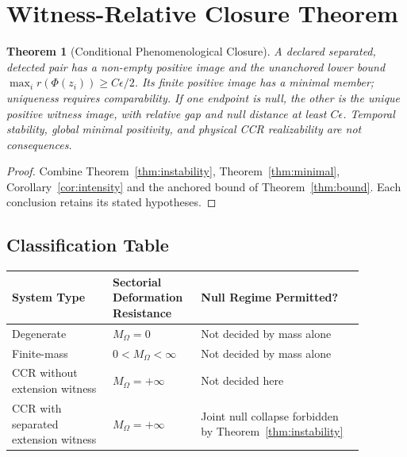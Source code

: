\documentclass[11pt,a4paper]{article}
\theoremstyle{plain}
\newtheorem{theorem}{Theorem}[section]
\theoremstyle{definition}
\theoremstyle{remark}
\newcommand{\MO}{M_\Omega}
\begin{document}
\section{Witness-Relative Closure Theorem}

\begin{theorem}[Conditional Phenomenological Closure]\label{thm:closure}
A declared separated, detected pair has a non-empty positive image and the unanchored lower bound $\max_i r(\Phi(z_i))\geq C\epsilon/2$. Its finite positive image has a minimal member; uniqueness requires comparability. If one endpoint is null, the other is the unique positive witness image, with relative gap and null distance at least $C\epsilon$. Temporal stability, global minimal positivity, and physical CCR realizability are not consequences.
\end{theorem}

\begin{proof}
Combine Theorem~\ref{thm:instability}, Theorem~\ref{thm:minimal}, Corollary~\ref{cor:intensity} and the anchored bound of Theorem~\ref{thm:bound}. Each conclusion retains its stated hypotheses.
\end{proof}

\subsection{Classification Table}

\begin{center}
\small
\begin{tabular}{|p{0.26\linewidth}|p{0.20\linewidth}|p{0.42\linewidth}|}
\hline
\textbf{System Type} & \textbf{Sectorial Deformation Resistance} & \textbf{Null Regime Permitted?} \\
\hline
Degenerate & $\MO = 0$ & Not decided by mass alone \\
Finite-mass & $0 < \MO < \infty$ & Not decided by mass alone \\
CCR without extension witness & $\MO = +\infty$ & Not decided here \\
CCR with separated extension witness & $\MO = +\infty$ & Joint null collapse forbidden by Theorem~\ref{thm:instability} \\
\hline
\end{tabular}
\end{center}
\end{document}
